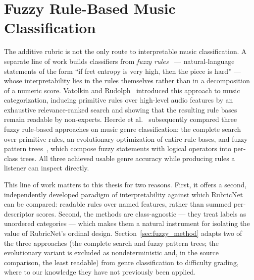 \section{Fuzzy Rule-Based Music Classification}
\label{sec:rw_fuzzy}
The additive rubric is not the only route to interpretable music classification. A separate line of work builds classifiers from \emph{fuzzy rules}~\cite{zadeh1965fuzzy} --- natural-language statements of the form ``if fret entropy is very high, then the piece is hard'' --- whose interpretability lies in the rules themselves rather than in a decomposition of a numeric score. Vatolkin and Rudolph~\cite{vatolkin2015interpretable} introduced this approach to music categorization, inducing primitive rules over high-level audio features by an exhaustive relevance-ranked search and showing that the resulting rule bases remain readable by non-experts. Heerde et al.~\cite{heerde2020comparing} subsequently compared three fuzzy rule-based approaches on music genre classification: the complete search over primitive rules, an evolutionary optimization of entire rule bases, and fuzzy pattern trees~\cite{huang2008patterntrees, senge2011topdown, senge2015fast}, which compose fuzzy statements with logical operators into per-class trees. All three achieved usable genre accuracy while producing rules a listener can inspect directly.

This line of work matters to this thesis for two reasons. First, it offers a second, independently developed paradigm of interpretability against which RubricNet can be compared: readable rules over named features, rather than summed per-descriptor scores. Second, the methods are class-agnostic --- they treat labels as unordered categories --- which makes them a natural instrument for isolating the value of RubricNet's ordinal design. Section~\ref{sec:fuzzy_method} adapts two of the three approaches (the complete search and fuzzy pattern trees; the evolutionary variant is excluded as nondeterministic and, in the source comparison, the least readable) from genre classification to difficulty grading, where to our knowledge they have not previously been applied.

